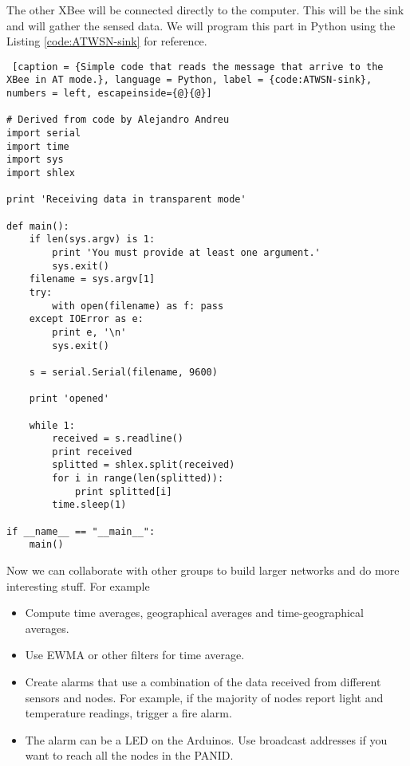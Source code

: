 The other XBee will be connected directly to the computer.
This will be the sink and will gather the sensed data.
We will program this part in Python using the Listing \ref{code:ATWSN-sink} for reference.


\begin{lstlisting} [caption = {Simple code that reads the message that arrive to the XBee in AT mode.}, language = Python, label = {code:ATWSN-sink}, numbers = left, escapeinside={@}{@}]

# Derived from code by Alejandro Andreu
import serial
import time
import sys
import shlex

print 'Receiving data in transparent mode'

def main():
    if len(sys.argv) is 1:
        print 'You must provide at least one argument.'
        sys.exit()
    filename = sys.argv[1]
    try:
        with open(filename) as f: pass
    except IOError as e:
        print e, '\n'
        sys.exit()

    s = serial.Serial(filename, 9600)

    print 'opened'

    while 1:
        received = s.readline()
        print received
        splitted = shlex.split(received)
        for i in range(len(splitted)):
            print splitted[i]
        time.sleep(1)

if __name__ == "__main__":
    main()
\end{lstlisting}

Now we can collaborate with other groups to build larger networks and do more interesting stuff.
For example
\begin{itemize}
\item Compute time averages, geographical averages and time-geographical averages.
\item Use EWMA or other filters for time average.
\item Create alarms that use a combination of the data received from different sensors and nodes. 
For example, if the majority of nodes report light and temperature readings, trigger a fire alarm.
\item The alarm can be a LED on the Arduinos.
Use broadcast addresses if you want to reach all the nodes in the PANID.
\end{itemize}
